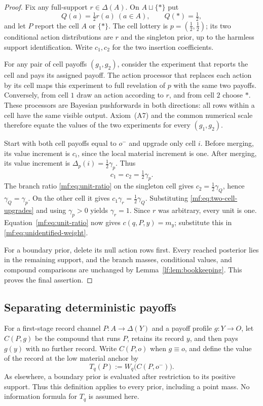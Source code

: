 \documentclass[11pt,a4paper]{article}
\theoremstyle{definition}
\newcommand{\D}{\Delta}
\newcommand{\1}{\mathbf 1}
\begin{document}
\begin{proof}
Fix any full-support $r\in\D(A)$.  On $A\sqcup\{\ast\}$ put
\[
 Q(a)=\tfrac12r(a)\ (a\in A),\qquad Q(\ast)=\tfrac12,
\]
and let $P$ report the cell $A$ or $\{\ast\}$.  The cell lottery is
$p=(\tfrac12,\tfrac12)$; its two conditional action distributions are
$r$ and the singleton prior, up to the harmless support identification.
Write $c_1,c_2$ for the two insertion coefficients.

For any pair of cell payoffs $(g_1,g_2)$, consider the experiment that
reports the cell and pays its assigned payoff.  The action processor that
replaces each action by its cell maps this experiment to full revelation
of $p$ with the same two payoffs.  Conversely, from cell $1$ draw an action
according to $r$, and from cell $2$ choose $\ast$.  These processors are
Bayesian pushforwards in both directions: all rows within a cell have the
same visible output.  Axiom~\textup{(A7)} and the common numerical scale
therefore equate the values of the two experiments for every $(g_1,g_2)$.

Start with both cell payoffs equal to $o^-$ and upgrade only cell $i$.
Before merging, its value increment is $c_i$, since the local material
increment is one.  After merging, its value increment is
$\Delta_p(i)=\tfrac12\gamma_p$.  Thus
\begin{equation}
 c_1=c_2=\tfrac12\gamma_p.
 \label{mf:eq:two-cell-upgrades}
\end{equation}
The branch ratio \eqref{mf:eq:unit-ratio} on the singleton cell gives
$c_2=\tfrac12\gamma_Q$, hence $\gamma_Q=\gamma_p$.
On the other cell it gives $c_1\gamma_r=\tfrac12\gamma_Q$.
Substituting \eqref{mf:eq:two-cell-upgrades} and using $\gamma_p>0$
yields $\gamma_r=1$.  Since $r$ was arbitrary, every unit is one.
Equation~\eqref{mf:eq:unit-ratio} now gives $c(q,P,y)=m_y$; substitute
this in \eqref{mf:eq:unidentified-weight}.

For a boundary prior, delete its null action rows first.  Every reached
posterior lies in the remaining support, and the branch masses, conditional
values, and compound comparisons are unchanged by
Lemma~\ref{lf:lem:bookkeeping}.  This proves the final assertion.
\end{proof}

\subsection{Separating deterministic payoffs}

For a first-stage record channel $P:A\to\D(Y)$ and a payoff profile
$g:Y\to O$, let $C(P,g)$ be the compound that runs $P$, retains its record
$y$, and then pays $g(y)$ with no further record.  Write $C(P,o)$ when
$g\equiv o$, and define the value of the record at the low material anchor by
\begin{equation}
T_q(P):=W_q\bigl(C(P,o^-)\bigr).
\label{mf:eq:trace-value}
\end{equation}
As elsewhere, a boundary prior is evaluated after restriction to its positive
support.  Thus this definition applies to every prior, including a point mass.
No information formula for $T_q$ is assumed here.
\end{document}
